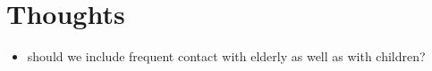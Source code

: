 \documentclass{article}
\begin{document}
\section{Thoughts}

\begin{itemize}
	\item should we include frequent contact with elderly as well as with children? 
\end{itemize}


% 

	
\end{document}
